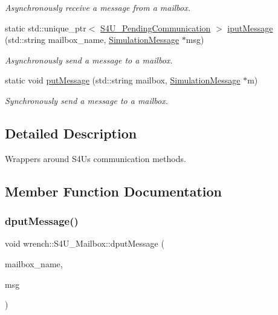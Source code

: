 \begin{DoxyCompactItemize}
\begin{DoxyCompactList}\small\item\em Asynchronously receive a message from a mailbox. \end{DoxyCompactList}\item 
static std\+::unique\+\_\+ptr$<$ \hyperlink{classwrench_1_1_s4_u___pending_communication}{S4\+U\+\_\+\+Pending\+Communication} $>$ \hyperlink{classwrench_1_1_s4_u___mailbox_abeed7e0ee6ecb15155eec05571b84ef3}{iput\+Message} (std\+::string mailbox\+\_\+name, \hyperlink{classwrench_1_1_simulation_message}{Simulation\+Message} $\ast$msg)
\begin{DoxyCompactList}\small\item\em Asynchronously send a message to a mailbox. \end{DoxyCompactList}\item 
static void \hyperlink{classwrench_1_1_s4_u___mailbox_a17c31699ab5e3ef1646ce6db96a651d0}{put\+Message} (std\+::string mailbox, \hyperlink{classwrench_1_1_simulation_message}{Simulation\+Message} $\ast$m)
\begin{DoxyCompactList}\small\item\em Synchronously send a message to a mailbox. \end{DoxyCompactList}\end{DoxyCompactItemize}


\subsection{Detailed Description}
Wrappers around S4U\textquotesingle{}s communication methods. 

\subsection{Member Function Documentation}
\mbox{\label{classwrench_1_1_s4_u___mailbox_a8104a8751389d6e61f8fec07bcc15034}} 
\subsubsection{\texorpdfstring{dput\+Message()}{dputMessage()}}
{\footnotesize\ttfamily void wrench\+::\+S4\+U\+\_\+\+Mailbox\+::dput\+Message (\begin{DoxyParamCaption}\item[{std\+::string}]{mailbox\+\_\+name,  }\item[{\hyperlink{classwrench_1_1_simulation_message}{Simulation\+Message} $\ast$}]{msg }\end{DoxyParamCaption})\hspace{0.3cm}{\ttfamily [static]}}



